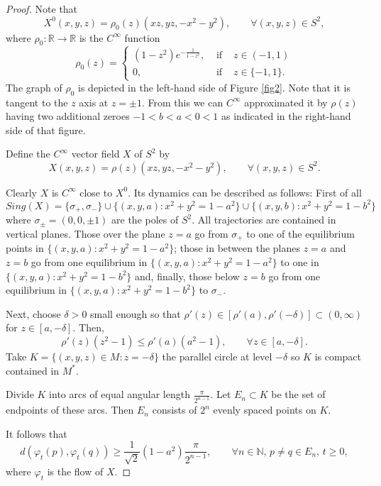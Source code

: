 \documentclass{amsart}
\numberwithin{equation}{section}
\begin{document}
\begin{proof}
Note that
$$
X^0(x,y,z)=\rho_0(z)(xz,yz,-x^2-y^2),\quad\quad\forall (x,y,z)\in S^2,
$$
where $\rho_0:\mathbb{R}\to\mathbb{R}$ is the $C^\infty$ function
$$
\rho_0(z)=
\left\{\begin{array}{rcl}
(1-z^2)e^{-\frac{1}{1-z^2}}, & \mbox{ if } & z\in (-1,1)\\
0, & \mbox{ if } & z\in \{-1,1\}.
\end{array}
\right.
$$
The graph of $\rho_0$ is depicted in the left-hand side of Figure \ref{fig2}.
Note that it is tangent to the $z$ axis at $z=\pm 1$. From this
we can $C^\infty$ approximated it by $\rho(z)$ having two additional zeroes $-1<b<a<0<1$ as indicated in the right-hand side of that figure.

Define the $C^\infty$ vector field $X$ of $S^2$ by
$$
X(x,y,z)=\rho(z)(xz,yz,-x^2-y^2),\quad\quad\forall (x,y,z)\in S^2.
$$

Clearly $X$ is $C^\infty$ close to $X^0$.
Its dynamics can be described as follows: First of all
$$
Sing(X)=\{\sigma_+,\sigma_-\}\cup\{(x,y,a):x^2+y^2=1-a^2\}\cup\{(x,y,b):x^2+y^2=1-b^2\}
$$
where $\sigma_\pm=(0,0,\pm 1)$ are the poles of $S^2$.
All trajectories are contained in vertical planes.
Those over the plane $z=a$ go from $\sigma_+$ to one of the equilibrium points in $\{(x,y,a):x^2+y^2=1-a^2\}$; those in between the planes $z=a$ and $z=b$ go from one equilibrium in $\{(x,y,a):x^2+y^2=1-a^2\}$
to one in $\{(x,y,a):x^2+y^2=1-b^2\}$ and, finally, those below
$z=b$ go from one equilibrium in $\{(x,y,a):x^2+y^2=1-b^2\}$ to $\sigma_-$.

Next, choose $\delta>0$ small enough so that
$\rho'(z)\in [\rho'(a),\rho'(-\delta)]\subset (0,\infty)$ for $z\in [a,-\delta]$.
Then,
\begin{equation}
\label{weissman}
\rho'(z)(z^2-1)\leq \rho'(a)(a^2-1),\quad\quad\forall z\in [a,-\delta].
\end{equation}
Take $K=\{(x,y,z)\in M:z=-\delta\}$ the parallel circle at level $-\delta$ so $K$ is compact contained in $M^*$.

Divide $K$ into arcs of equal angular length $\frac{\pi}{2^{n-1}}$.
Let $E_n\subset K$ be the set of endpoints of these arcs. Then $E_n$ consists of $2^n$ evenly spaced points on $K$.

It follows that
\begin{equation}
\label{pelo1}
d(\varphi_t(p),\varphi_t(q))\geq \frac{1}{\sqrt{2}}(1-a^2)\frac{\pi}{2^{n-1}},\quad\quad\forall n\in\mathbb{N},\, p\neq q\in E_n,\,t\geq0,
\end{equation}
where $\varphi_t$ is the flow of $X$.


\end{proof}
\end{document}
